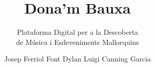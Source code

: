 \documentclass{tudelft-report}
\begin{document}
\frontmatter

\title{Dona'm Bauxa}
\subtitle{Plataforma Digital per a la Descoberta\\de Música i Esdeveniments Mallorquins}
\author{Josep Ferriol Font \newline Dylan Luigi Canning Garcia}

\subject{Tecnologia Multimèdia} %

\makecover





\tableofcontents




\mainmatter









\setcounter{biburlnumpenalty}{7000}
\setcounter{biburllcpenalty}{7000}
\setcounter{biburlucpenalty}{7000}

\printbibliography[heading=bibintoc,title=Referències]


\appendix



\end{document}
